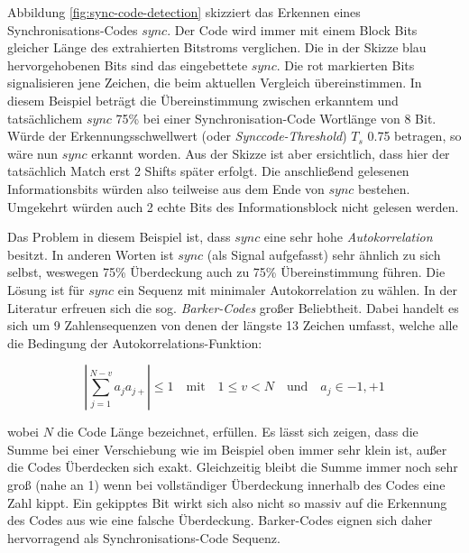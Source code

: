 Abbildung \ref{fig:sync-code-detection} skizziert das Erkennen eines Synchronisations-Codes $sync$. Der Code wird immer mit einem Block Bits gleicher \mbox{Länge} des extrahierten Bitstroms verglichen. Die in der Skizze blau hervorgehobenen Bits sind das ein\-gebettete $sync$. Die rot markierten Bits signal\-isieren jene Zeichen, die beim \mbox{aktuellen} Vergleich über\-einstimmen. In diesem Beispiel beträgt die Über\-einstimmung zwischen er\-kanntem und tatsächlichem $sync$ 75\% bei einer Synchronisation-Code Wortlänge von 8 Bit. Würde der Erkennungsschwellwert (oder \textit{Synccode-Threshold}) ${T}_{s}$ 0.75 betragen, so wäre nun $sync$ erkannt worden. Aus der Skizze ist aber ersichtlich, dass hier der tatsächlich Match erst 2 Shifts später erfolgt. Die anschließend gelesenen Informationsbits würden also teilweise aus dem Ende von $sync$ bestehen. Umgekehrt würden auch 2 echte Bits des Informationsblock nicht gelesen werden.

Das Problem in diesem Beispiel ist, dass $sync$ eine sehr hohe \textit{Autokorrelation} besitzt. In anderen Worten ist $sync$ (als Signal aufgefasst) sehr ähnlich zu sich selbst, weswegen 75\% Überdeckung auch zu 75\% Übereinstimmung führen. Die Lösung ist für $sync$ ein Sequenz mit minimaler Autokorrelation zu wählen. In der Literatur\cite{huang2002blind}\cite{lie2006robust}\cite{chang2012location} erfreuen sich die sog. \textit{Barker-Codes}\cite{barker1953group} großer Beliebtheit. Dabei handelt es sich um 9 Zahlensequenzen von denen der längste 13 Zeichen umfasst, welche alle die Bedingung der Autokorrelations-Funktion:

	 \begin{equation}
		 | \sum\limits_{j=1}^{N-v} a_j {a}_{j+} | \leq 1 \quad\mbox{mit}\quad 1 \leq v < N \quad\mbox{und}\quad a_j \in {-1,+1}
	 	\label{equ:barker-correlation}
	 \end{equation}

wobei $N$ die Code Länge bezeichnet, erfüllen. Es lässt sich zeigen, dass die Summe bei einer Verschiebung wie im Beispiel oben immer sehr klein ist, außer die Codes Überdecken sich exakt. Gleichzeitig bleibt die Summe immer noch sehr groß (nahe an 1) wenn bei vollständiger Überdeckung innerhalb des Codes eine Zahl kippt. Ein gekipptes Bit wirkt sich also nicht so massiv auf die Erkennung des Codes aus wie eine falsche Überdeckung. Barker-Codes eignen sich daher hervorragend als Synchronisations-Code Sequenz. 

